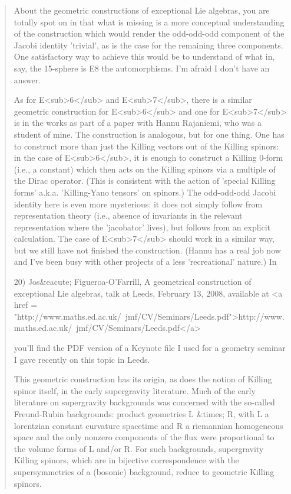 \begin{quote}

About the geometric constructions of exceptional Lie algebras, you are
totally spot on in that what is missing is a more conceptual
understanding of the construction which would render the odd-odd-odd
component of the Jacobi identity 'trivial', as is the case for the
remaining three components.  One satisfactory way to achieve this
would be to understand of what in, say, the 15-sphere is E8 the
automorphisms.  I'm afraid I don't have an answer.

As for E<sub>6</sub> and E<sub>7</sub>, there is a similar geometric
construction for E<sub>6</sub> and one for E<sub>7</sub> is in the
works as part of a paper with Hannu Rajaniemi, who was a student of
mine.  The construction is analogous, but for one thing.  One has to
construct more than just the Killing vectors out of the Killing
spinors: in the case of E<sub>6</sub>, it is enough to construct a
Killing 0-form (i.e., a constant) which then acts on the Killing
spinors via a multiple of the Dirac operator.  (This is consistent
with the action of 'special Killing forms' a.k.a. 'Killing-Yano
tensors' on spinors.)  The odd-odd-odd Jacobi identity here is even
more mysterious: it does not simply follow from representation theory
(i.e., absence of invariants in the relevant representation where the
'jacobator' lives), but follows from an explicit calculation.  The
case of E<sub>7</sub> should work in a similar way, but we still have
not finished the construction.  (Hannu has a real job now and I've
been busy with other projects of a less 'recreational' nature.)  In

20) Jos&eacute; Figueroa-O'Farrill, A geometrical construction of exceptional
Lie algebras, talk at Leeds, February 13, 2008, available at <a href = "http://www.maths.ed.ac.uk/~jmf/CV/Seminars/Leeds.pdf">http://www.maths.ed.ac.uk/~jmf/CV/Seminars/Leeds.pdf</a>

you'll find the PDF version of a Keynote file I used for a geometry
seminar I gave recently on this topic in Leeds.

This geometric construction has its origin, as does the notion of
Killing spinor itself, in the early supergravity literature.  Much of
the early literature on supergravity backgrounds was concerned with
the so-called Freund-Rubin backgrounds: product geometries L &times; R, with
L a lorentzian constant curvature spacetime and R a riemannian
homogeneous space and the only nonzero components of the flux were
proportional to the volume forms of L and/or R.  For such backgrounds,
supergravity Killing spinors, which are in bijective correspondence
with the supersymmetries of a (bosonic) background, reduce to
geometric Killing spinors.


\end{quote}
